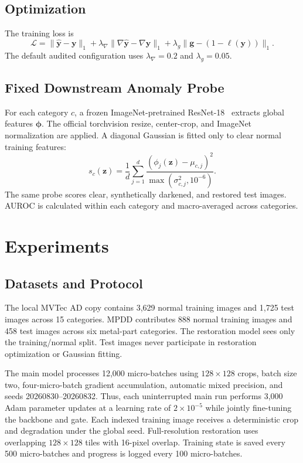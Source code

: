 \documentclass[10pt,journal]{IEEEtran}
\begin{document}
\subsection{Optimization}
The training loss is
\begin{equation}
\mathcal{L}=\lVert\hat{\mathbf{y}}-\mathbf{y}\rVert_1+\lambda_{\nabla}\lVert\nabla\hat{\mathbf{y}}-\nabla\mathbf{y}\rVert_1+\lambda_g\lVert\mathbf{g}-(1-\ell(\mathbf{y}))\rVert_1.
\end{equation}
The default audited configuration uses $\lambda_{\nabla}=0.2$ and $\lambda_g=0.05$.

\subsection{Fixed Downstream Anomaly Probe}
For each category $c$, a frozen ImageNet-pretrained ResNet-18~\cite{he2016resnet} extracts global features $\boldsymbol{\phi}$. The official torchvision resize, center-crop, and ImageNet normalization are applied. A diagonal Gaussian is fitted only to clear normal training features:
\begin{equation}
s_c(\mathbf{z})=\frac{1}{d}\sum_{j=1}^{d}\frac{(\phi_j(\mathbf{z})-\mu_{c,j})^2}{\max(\sigma^2_{c,j},10^{-6})}.
\end{equation}
The same probe scores clear, synthetically darkened, and restored test images. AUROC is calculated within each category and macro-averaged across categories.

\section{Experiments}
\subsection{Datasets and Protocol}
The local MVTec AD copy contains 3,629 normal training images and 1,725 test images across 15 categories. MPDD contributes 888 normal training images and 458 test images across six metal-part categories. The restoration model sees only the training/normal split. Test images never participate in restoration optimization or Gaussian fitting.

The main model processes 12,000 micro-batches using $128\times128$ crops, batch size two, four-micro-batch gradient accumulation, automatic mixed precision, and seeds 20260830--20260832. Thus, each uninterrupted main run performs 3,000 Adam parameter updates at a learning rate of $2\times10^{-5}$ while jointly fine-tuning the backbone and gate. Each indexed training image receives a deterministic crop and degradation under the global seed. Full-resolution restoration uses overlapping $128\times128$ tiles with 16-pixel overlap. Training state is saved every 500 micro-batches and progress is logged every 100 micro-batches.
\end{document}
